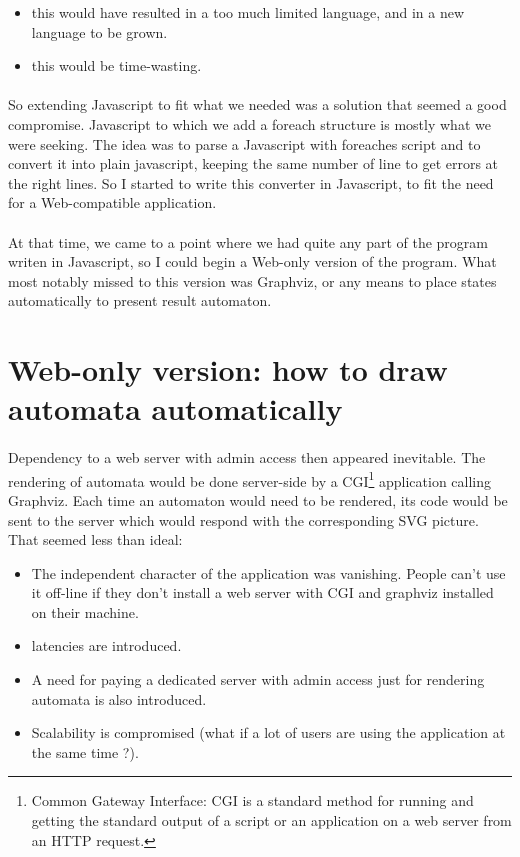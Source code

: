 \documentclass{article}
\begin{document}
\begin{sloppypar}
\begin{itemize}
	\item{ this would have resulted in a too much limited language, and in a new language to be grown.}
	\item{ this would be time-wasting.}
\end{itemize}

\paragraph{}
So extending Javascript to fit what we needed was a solution that seemed a good compromise. Javascript to which we add a foreach structure is mostly what we were seeking. The idea was to parse a Javascript with foreaches script and to convert it into plain javascript, keeping the same number of line to get errors at the right lines. So I started to write this converter in Javascript, to fit the need for a Web-compatible application.

   
\paragraph{}
At that time, we came to a point where we had quite any part of the program writen in Javascript, so I could begin a Web-only version of the program. What most notably missed to this version was Graphviz, or any means to place states automatically to present result automaton.




\section{ Web-only version: how to draw automata automatically}


\paragraph{}
Dependency to a web server with admin access then appeared inevitable. The rendering of automata would be done server-side by a CGI\footnote{Common Gateway Interface: CGI is a standard method for running and getting the standard output of a script or an application on a web server from an HTTP request.} application calling Graphviz. Each time an automaton would need to be rendered, its code would be sent to the server which would respond with the corresponding SVG picture.
   That seemed less than ideal:
    
\begin{itemize}
	\item{ The independent character of the application was vanishing. People can't use it off-line if they don't install a web server with CGI and graphviz installed on their machine.}
	\item{ latencies are introduced.}
	\item{ A need for paying a dedicated server with admin access just for rendering automata is also introduced.}
	\item{ Scalability is compromised (what if a lot of users are using the application at the same time ?).}
\end{itemize}


\end{sloppypar}
\end{document}
